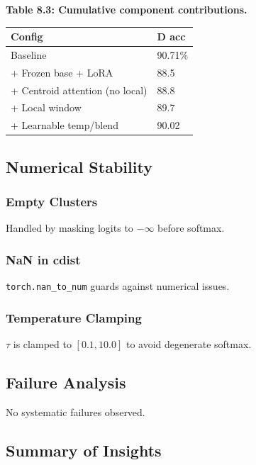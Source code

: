 \textbf{Table 8.3: Cumulative component contributions.}

\begin{table}[H]
\centering
\small
\begin{tabular}{ll}
\toprule
\textbf{Config} & \textbf{D acc} \\
\midrule
Baseline & 90.71\% \\
+ Frozen base + LoRA & 88.5 \\
+ Centroid attention (no local) & 88.8 \\
+ Local window & 89.7 \\
+ Learnable temp/blend & 90.02 \\
\bottomrule
\end{tabular}
\end{table}

\subsection{Numerical Stability}

\subsubsection{Empty Clusters}

Handled by masking logits to $-\infty$ before softmax.

\subsubsection{NaN in cdist}

\texttt{torch.nan\_to\_num} guards against numerical issues.

\subsubsection{Temperature Clamping}

$\tau$ is clamped to $[0.1, 10.0]$ to avoid degenerate softmax.

\subsection{Failure Analysis}

No systematic failures observed.

\subsection{Summary of Insights}

